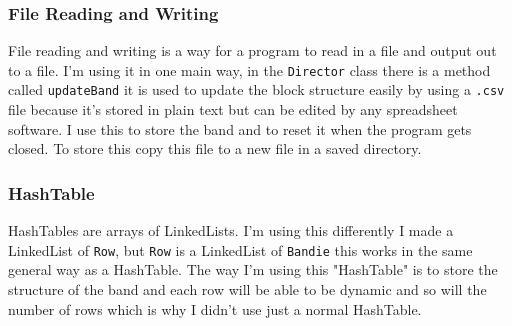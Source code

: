 \documentclass{article}
\begin{document}
\subsubsection{File Reading and Writing}
File reading and writing is a way for a program to read in a file and output out to a file. I'm using it in one main way, in the \verb|Director| class there is a method called \verb|updateBand| it is used to update the block structure easily by using a \verb|.csv| file because it's stored in plain text but can be edited by any spreadsheet software. I use this to store the band and to reset it when the program gets closed. To store this copy this file to a new file in a saved directory\cite{moveFile}.
\subsubsection{HashTable}
HashTables\cite{hashTable} are arrays of LinkedLists\cite{linkedList}. I'm using this differently I made a LinkedList of \verb|Row|, but \verb|Row| is a LinkedList of \verb|Bandie| this works in the same general way as a HashTable. The way I'm using this "HashTable" is to store the structure of the band and each row will be able to be dynamic and so will the number of rows which is why I didn't use just a normal HashTable.
\end{document}
